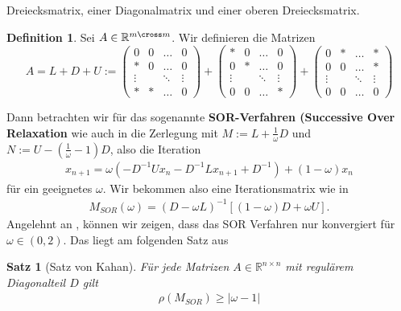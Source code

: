 \documentclass[smallheadings]{scrartcl}
\newtheorem{theorem}{Satz}
\theoremstyle{definition}
\newtheorem{definition}{Definition}[section]
\begin{document}
			Dreiecksmatrix, einer Diagonalmatrix und einer oberen Dreiecksmatrix.
			\begin{definition}
			Sei $A\in \mathbb{R}^{m\cross m}$.  Wir definieren die Matrizen
			$$A=L+D+U:=\begin{pmatrix}
			0&0&\hdots &0\\
			*&0&\hdots &0\\
			\vdots &&\ddots &\vdots\\
			*&*&\hdots &0
			\end{pmatrix}+\begin{pmatrix}
			*&0&\hdots &0\\
			0&*&\hdots &0\\
			\vdots &&\ddots &\vdots\\
			0&0&\hdots &*
			\end{pmatrix}+\begin{pmatrix}
			0&*&\hdots &*\\
			0&0&\hdots &*\\
			\vdots &&\ddots &\vdots\\
			0&0&\hdots &0
			\end{pmatrix}$$
			
			\end{definition}
			
			Dann betrachten wir für das sogenannte \textbf{SOR-Verfahren (Successive 
			Over Relaxation} wie auch in \citep{skrpit} die Zerlegung  mit
			$M:=L+\frac{1}{\omega}D$ und $N:=U-(\frac{1}{\omega} -1)D$,  also die 
			Iteration 
			\begin{align}\label{sor_iteration}
			x_{n+1}=\omega (-D^{-1}Ux_n-D^{-1}Lx_{n+1}+D^{-1})+(1-\omega )x_n
			\end{align}
			für ein geeignetes $\omega$.
			Wir bekommen also eine Iterationsmatrix wie in \citep{konvergenz}
			\begin{align*}
			M_{SOR}(\omega )=(D-\omega L)^{-1}[(1-\omega)D+\omega U].
			\end{align*}
			Angelehnt an \citep{konvergenz}, können wir zeigen,  dass das SOR Verfahren nur konvergiert für $\omega \in (0,2)$. Das liegt am folgenden Satz aus \citep{kovergenz}
			
			\begin{theorem}[Satz von Kahan]
			Für jede Matrizen $A\in \mathbb{R}^{n\times n }$ mit regulärem Diagonalteil $D$ gilt 
			\begin{align}\label{omegabetween02}
			\rho (M_{SOR} )\geq |\omega -1|
			\end{align}
			\end{theorem}
			
\end{document}
